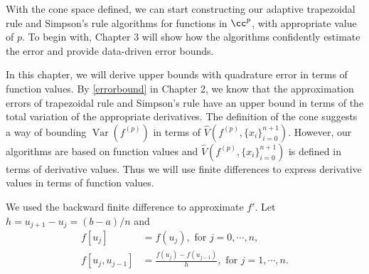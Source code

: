 \documentclass[draft]{iitthesis}
\DeclareMathOperator{\Var}{Var}
\theoremstyle{definition}
\theoremstyle{remark}
\begin{document}
With the cone space defined, we can start constructing our adaptive trapezoidal rule and Simpson's rule algorithms for functions in $\cc^{p}$, with appropriate value of $p$. To begin with, Chapter 3 will show how the algorithms confidently estimate the error and provide data-driven error bounds.





In this chapter, we will derive upper bounds with quadrature error in terms of function values. By \eqref{errorbound} in Chapter 2, we know that the approximation errors of trapezoidal rule and Simpson's rule have an upper bound in terms of the total variation of the appropriate derivatives. The definition of the cone suggests a way of bounding $\Var(f^{(p)})$ in terms of $\widehat{V}(f^{(p)},\{x_i\}_{i=0}^{n+1})$. However, our algorithms are based on function values and $\widehat{V}(f^{(p)},\{x_i\}_{i=0}^{n+1})$ is defined in terms of derivative values. Thus we will use finite differences to express derivative values in terms of function values.


We used the backward finite difference to approximate $f'$. Let $h=u_{j+1}-u_{j}=(b-a)/n$ and
\begin{align*}
  f[u_{j}]&=f(u_{j}), \text{ for } j=0,\cdots, n,\\
  f[u_{j},u_{j-1}]&=\frac{f(u_{j})-f(u_{j-1})}{h},\text{ for } j=1, \cdots, n.
\end{align*}
\end{document}
